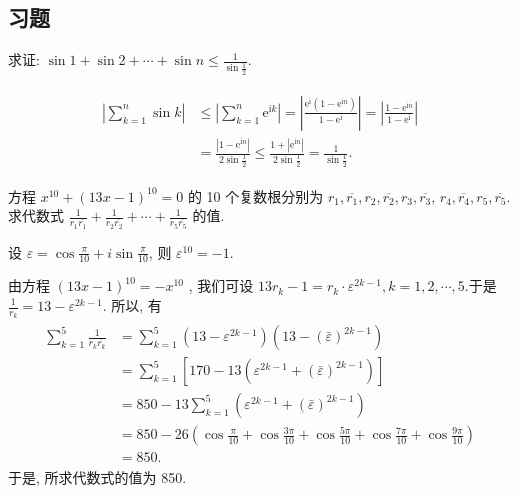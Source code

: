 \subsection{习题}
\begin{exercise}
	求证: $\sin 1+\sin 2+\cdots+\sin n \leqslant \frac{1}{\sin \frac{1}{2}}$.
\end{exercise}
\begin{solution}
	\begin{align*}
		\begin{aligned}
			\left|\sum_{k=1}^n \sin k\right| & \leqslant\left|\sum_{k=1}^n \mathrm{e}^{\mathrm{i} k}\right|=\left|\frac{\mathrm{e}^{\mathrm{i}}\left(1-\mathrm{e}^{\mathrm{i} n}\right)}{1-\mathrm{e}^{\mathrm{i}}}\right|=\left|\frac{1-\mathrm{e}^{\mathrm{i} n}}{1-\mathrm{e}^{\mathrm{i}}}\right| \\
			                                 & =\frac{\left|1-\mathrm{e}^{\mathrm{i} n}\right|}{2 \sin \frac{1}{2}} \leqslant \frac{1+\left|\mathrm{e}^{\mathrm{i} n}\right|}{2 \sin \frac{1}{2}}=\frac{1}{\sin \frac{1}{2}} .
		\end{aligned}
	\end{align*}
\end{solution}

\begin{exercise}
	方程 $x^{10}+(13 x-1)^{10}=0$ 的 10 个复数根分别为 $r_1, \overline{r_1}, r_2, \overline{r_2}, r_3, \overline{r_3}$, $r_4, \overline{r_4}, r_5, \overline{r_5}$. 求代数式 $\frac{1}{r_1 \overline{r_1}}+\frac{1}{r_2 \overline{r_2}}+\cdots+\frac{1}{r_5 \overline{r_5}}$ 的值.
\end{exercise}
\begin{solution}
	设 $\varepsilon=\cos \frac{\pi}{10}+i \sin \frac{\pi}{10}$, 则 $\varepsilon^{10}=-1$.

	由方程 $(13 x-1)^{10}=-x^{10}$ , 我们可设 $13 r_k-1=r_k \cdot \varepsilon^{2 k-1}, k=1,2, \cdots, 5$.于是 $\frac{1}{r_k}=13-\varepsilon^{2 k-1}$. 所以, 有
	\begin{align*}
		\begin{aligned}
			\sum_{k=1}^5 \frac{1}{r_k \overline{r_k}} & =\sum_{k=1}^5\left(13-\varepsilon^{2 k-1}\right)\left(13-(\bar{\varepsilon})^{2 k-1}\right)                                     \\
			                                          & =\sum_{k=1}^5\left[170-13\left(\varepsilon^{2 k-1}+(\bar{\varepsilon})^{2 k-1}\right)\right]                                    \\
			                                          & =850-13 \sum_{k=1}^5\left(\varepsilon^{2 k-1}+(\bar{\varepsilon})^{2 k-1}\right)                                                \\
			                                          & =850-26\left(\cos \frac{\pi}{10}+\cos \frac{3 \pi}{10}+\cos \frac{5 \pi}{10}+\cos \frac{7 \pi}{10}+\cos \frac{9 \pi}{10}\right) \\
			                                          & =850 .
		\end{aligned}
	\end{align*}
	于是, 所求代数式的值为 850.
\end{solution}

